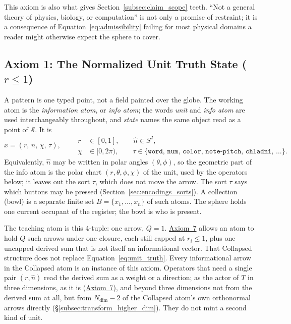 \documentclass[12pt, a4paper]{article}
\begin{document}
This axiom is also what gives
Section~\ref{subsec:claim_scope} teeth. ``Not a general theory of
physics, biology, or computation'' is not only a promise of
restraint; it is a consequence of Equation~\eqref{eq:admissibility}
failing for most physical domains a reader might otherwise expect
the sphere to cover.

\subsection{Axiom 1: The Normalized Unit Truth State ($r \le 1$)}
\label{subsec:axiom1}
A pattern is one typed point, not a field painted over the globe. The working atom is the \emph{information atom}, or \emph{info atom}; the words \emph{unit} and \emph{info atom} are used interchangeably throughout, and \emph{state} names the same object read as a point of $\mathcal{S}$. It is
\begin{equation}
    x = (r,\,\hat n,\,\chi,\,\tau),
    \qquad
    \begin{aligned}
    r &\in [0,1],
    \qquad
    \hat n \in S^2,\\
    \chi &\in [0,2\pi),
    \qquad
    \tau \in \{\mathtt{word},\,\mathtt{num},\,\mathtt{color},\,\mathtt{note\text{-}pitch},\,\mathtt{chladni},\,\ldots\}.
    \end{aligned}
    \label{eq:unit_truth}
\end{equation}
Equivalently, $\hat n$ may be written in polar angles $(\theta,\phi)$, so the geometric part of the info atom is the polar chart $(r,\theta,\phi,\chi)$ of the unit, used by the operators below; it leaves out the sort $\tau$, which does not move the arrow. The sort $\tau$ says which buttons may be pressed (Section~\ref{sec:encodings_sorts}). A collection (bowl) is a separate finite set $B=\{x_1,\ldots,x_n\}$ of such atoms. The sphere holds one current occupant of the register; the bowl is who is present.

The teaching atom is this 4-tuple: one arrow, $Q=1$. \hyperref[subsec:axiom_v1_metrics]{Axiom~7} allows an atom to hold $Q$ such arrows under one closure, each still capped at $r_i\le 1$, plus one uncapped derived sum that is not itself an informational vector. That Collapsed structure does not replace Equation~\eqref{eq:unit_truth}. Every informational arrow in the Collapsed atom is an instance of this axiom. Operators that need a single pair $(r,\hat n)$ read the derived sum as a weight or a direction; as the actor of $T$ in three dimensions, as it is (\hyperref[subsec:axiom_v1_metrics]{Axiom~7}), and beyond three dimensions not from the derived sum at all, but from $N_{\mathrm{dim}}-2$ of the Collapsed atom's own orthonormal arrows directly (\S\ref{subsec:transform_higher_dim}). They do not mint a second kind of unit.
\end{document}
